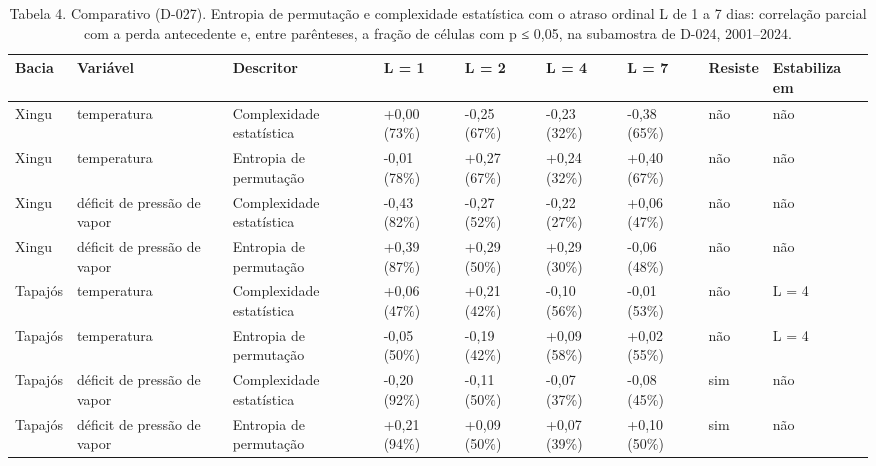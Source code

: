 \begin{table}
\caption{Tabela 4. Comparativo (D-027). Entropia de permutação e complexidade estatística com o atraso ordinal L de 1 a 7 dias: correlação parcial com a perda antecedente e, entre parênteses, a fração de células com p ≤ 0,05, na subamostra de D-024, 2001–2024.}
\label{tab:07_descritores::atrasos_ordinais}
\begin{tabular}{lllllllll}
\toprule
Bacia & Variável & Descritor & L = 1 & L = 2 & L = 4 & L = 7 & Resiste & Estabiliza em \\
\midrule
Xingu & temperatura & Complexidade estatística & +0,00 (73\%) & -0,25 (67\%) & -0,23 (32\%) & -0,38 (65\%) & não & não \\
Xingu & temperatura & Entropia de permutação & -0,01 (78\%) & +0,27 (67\%) & +0,24 (32\%) & +0,40 (67\%) & não & não \\
Xingu & déficit de pressão de vapor & Complexidade estatística & -0,43 (82\%) & -0,27 (52\%) & -0,22 (27\%) & +0,06 (47\%) & não & não \\
Xingu & déficit de pressão de vapor & Entropia de permutação & +0,39 (87\%) & +0,29 (50\%) & +0,29 (30\%) & -0,06 (48\%) & não & não \\
Tapajós & temperatura & Complexidade estatística & +0,06 (47\%) & +0,21 (42\%) & -0,10 (56\%) & -0,01 (53\%) & não & L = 4 \\
Tapajós & temperatura & Entropia de permutação & -0,05 (50\%) & -0,19 (42\%) & +0,09 (58\%) & +0,02 (55\%) & não & L = 4 \\
Tapajós & déficit de pressão de vapor & Complexidade estatística & -0,20 (92\%) & -0,11 (50\%) & -0,07 (37\%) & -0,08 (45\%) & sim & não \\
Tapajós & déficit de pressão de vapor & Entropia de permutação & +0,21 (94\%) & +0,09 (50\%) & +0,07 (39\%) & +0,10 (50\%) & sim & não \\
\bottomrule
\end{tabular}
\end{table}
